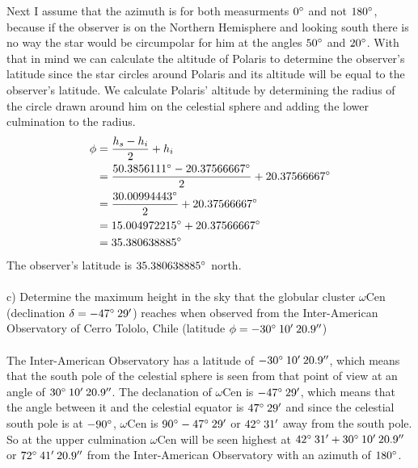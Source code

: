 Next I assume that the azimuth is for both measurments $0 \degree$ and not $180 \degree$, because if the
observer is on the Northern Hemisphere and looking south there is no way the star would be circumpolar
for him at the angles $50 \degree$ and $20 \degree$. With that in mind we can calculate the altitude of
Polaris to determine the observer's latitude since the star circles around Polaris and its altitude will 
be equal to the observer's latitude. We calculate Polaris' altitude by determining the radius of the 
circle drawn around him on the celestial sphere and adding the lower culmination to the radius.
\begin{equation*}
    \begin{split}
        \phi &= \frac{h_s - h_i}{2} + h_i\\
             &= \frac{50.3856111 \degree - 20.37566667 \degree}{2} + 20.37566667 \degree\\
             &= \frac{30.00994443 \degree}{2} + 20.37566667 \degree\\
             &= 15.004972215 \degree + 20.37566667 \degree\\
             &= 35.380638885 \degree\\
    \end{split}
\end{equation*}
The observer's latitude is $35.380638885 \degree$ north.\\
\\
\noindent
c) Determine the maximum height in the sky that the globular cluster $\omega$Cen (declination 
$\delta = -47 \degree \: 29'$) reaches when observed from the Inter-American Observatory of Cerro Tololo,
Chile (latitude $\phi = -30 \degree \: 10' \: 20.9''$)\\
\\
The Inter-American Observatory has a latitude of $-30 \degree \: 10' \: 20.9''$, which means that the 
south pole of the celestial sphere is seen from that point of view at an angle of 
$30 \degree \: 10' \: 20.9''$. The declanation of $\omega$Cen is $-47 \degree \: 29'$, which means that
the angle between it and the celestial equator is $47 \degree \: 29'$ and since the celestial south pole
is at $-90 \degree$, $\omega$Cen is $90 \degree - 47 \degree \: 29'$ or $42 \degree \: 31'$ away from the
south pole. So at the upper culmination $\omega$Cen will be seen highest at 
$42 \degree \: 31' + 30 \degree \: 10' \: 20.9''$ or $72 \degree \: 41' \: 20.9''$ from the Inter-American 
Observatory with an azimuth of $180 \degree$.

